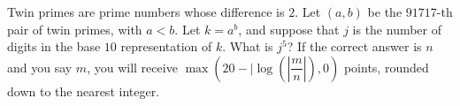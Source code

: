 Twin primes are prime numbers whose difference is $2$. Let $(a, b)$ be the $91717$-th pair of twin primes, with $a < b$. Let $k = a^b$, and suppose that $j$ is the number of digits in the base $10$ representation of $k$. What is $j^5$? If the correct answer is $n$ and you say $m$, you will receive $\max (20 - | \log (| \dfrac{m}{n} |), 0 )$ points, rounded down to the nearest integer.
